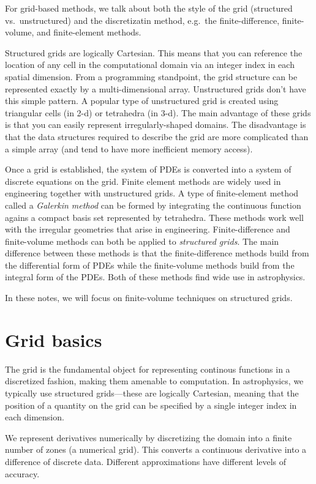 For grid-based methods, we talk about both the style of the grid
(structured vs.\ unstructured) and the discretizatin method, e.g.\ the
finite-difference, finite-volume, and finite-element methods.  

Structured grids are logically Cartesian.  This means that you can
reference the location of any cell in the computational domain via an
integer index in each spatial dimension.  From a programming
standpoint, the grid structure can be represented exactly by a 
multi-dimensional array.  Unstructured grids don't have
this simple pattern.  A popular type of unstructured grid is created 
using triangular cells (in 2-d) or tetrahedra (in 3-d).  The main advantage
of these grids is that you can easily represent irregularly-shaped domains.
The disadvantage is that the data structures required to describe the 
grid are more complicated than a simple array (and tend to have more
inefficient memory access).

Once a grid is established, the system of PDEs is converted into a 
system of discrete equations on the grid. 
Finite element methods are widely used in
engineering together with unstructured grids.  A type of finite-element
method called a {\em Galerkin method} can be formed by integrating the
continuous function agains a compact basis set represented by
tetrahedra.  These methods work well with the irregular geometries
that arise in engineering.  Finite-difference and finite-volume
methods can both be applied to {\em structured grids}. 
The main difference between these methods is that the
finite-difference methods build from the differential form of PDEs
while the finite-volume methods build from the integral form of the
PDEs.  Both of these methods find wide use in astrophysics.

In these notes, we will focus on finite-volume techniques on
structured grids.  


\section{Grid basics}

The grid is the fundamental object for representing continous
functions in a discretized fashion, making them amenable to
computation.  In astrophysics, we typically use structured
grids---these are logically Cartesian, meaning that the position of a
quantity on the grid can be specified by a single integer index in
each dimension.  

We represent derivatives numerically by discretizing the domain into
a finite number of zones (a numerical grid).
This converts a continuous derivative into a difference of discrete data.  
Different approximations have different levels of accuracy.  

